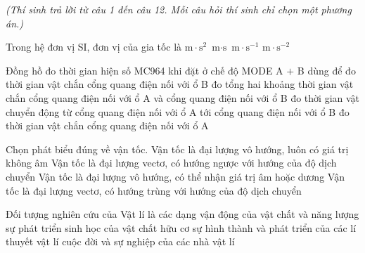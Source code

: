 
\vspace{0.15cm}
\begin{flushleft}
	{\color{blue!50!green}}
	\textit{\small (Thí sinh trả lời từ câu 1 đến câu 12. Mỗi câu hỏi thí sinh chỉ chọn một phương án.)}
\end{flushleft}
\setcounter{ex}{0}
\setcounter{bt}{0}

\begin{ex}
	Trong hệ đơn vị SI, đơn vị của gia tốc là
	\choice
	{$\text{m}\cdot\text{s}^2$}
	{$\text{m}\cdot\text{s}$}
	{$\text{m}\cdot\text{s}^{-1}$}
	{\True $\text{m}\cdot\text{s}^{-2}$}
\end{ex}

\begin{ex}
	Đồng hồ đo thời gian hiện số MC964 khi đặt ở chế độ MODE A $+$ B dùng để
	\choice
	{đo thời gian vật chắn cổng quang điện nối với ổ B}
	{\True đo tổng hai khoảng thời gian vật chắn cổng quang điện nối với ổ A và cổng quang điện nối với ổ B}
	{đo thời gian vật chuyển động từ cổng quang điện nối với ổ A tới cổng quang điện nối với ổ B}
	{đo thời gian vật chắn cổng quang điện nối với ổ A}
\end{ex}

\begin{ex}
	Chọn phát biểu đúng về vận tốc.
	\choice
	{Vận tốc là đại lượng vô hướng, luôn có giá trị không âm}
	{Vận tốc là đại lượng vectơ, có hướng ngược với hướng của độ dịch chuyển}
	{Vận tốc là đại lượng vô hướng, có thể nhận giá trị âm hoặc dương}
	{\True Vận tốc là đại lượng vectơ, có hướng trùng với hướng của độ dịch chuyển}
\end{ex}

\begin{ex}
	Đối tượng nghiên cứu của Vật lí là
	\choice
	{\True các dạng vận động của vật chất và năng lượng}
	{sự phát triển sinh học của vật chất hữu cơ}
	{sự hình thành và phát triển của các lí thuyết vật lí}
	{cuộc đời và sự nghiệp của các nhà vật lí}
\end{ex}

